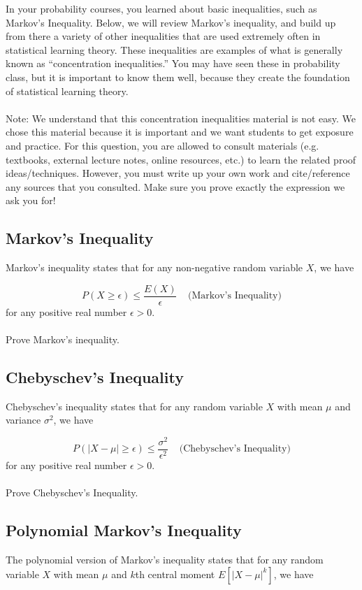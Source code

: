 \documentclass{exam}
\begin{document}
In your probability courses, you learned about basic inequalities, such as Markov's Inequality. Below, we will review Markov's inequality, and build up from there a variety of other inequalities that are used extremely often in statistical learning theory. These inequalities are examples of what is generally known as ``concentration inequalities.'' You may have seen these in probability class, but it is important to know them well, because they create the foundation of statistical learning theory. 
\\\\
Note: We understand that this concentration inequalities material is not easy. We chose this material because it is important and we want students to get exposure and practice. For this question, you are allowed to consult materials (e.g. textbooks, external lecture notes, online resources, etc.) to learn the related proof ideas/techniques. However, you must write up your own work and cite/reference any sources that you consulted. Make sure you prove exactly the expression we ask you for! 

\subsection{Markov's Inequality}
Markov's inequality states that for any non-negative random variable $X$, we have

$$P(X \geq \epsilon) \leq \frac{E(X)}{\epsilon}\;\;\;\; \textrm{(Markov's Inequality)} $$
for any positive real number $\epsilon > 0$. 
\\\\
Prove Markov's inequality. 

\subsection{Chebyschev's Inequality}
Chebyschev's inequality states that for any random variable $X$ with mean $\mu$ and variance $\sigma^2$, we have

$$P( |X-\mu| \geq \epsilon) \leq \frac{\sigma^2}{\epsilon^2} \;\;\;\; \textrm{(Chebyschev's Inequality)}$$
for any positive real number $\epsilon > 0$. 
\\\\
Prove Chebyschev's Inequality. 

\subsection{Polynomial Markov's Inequality}
The polynomial version of Markov's inequality states that for any random variable $X$ with mean $\mu$ and $k$th central moment $E[|X - \mu|^k]$, we have
\end{document}
